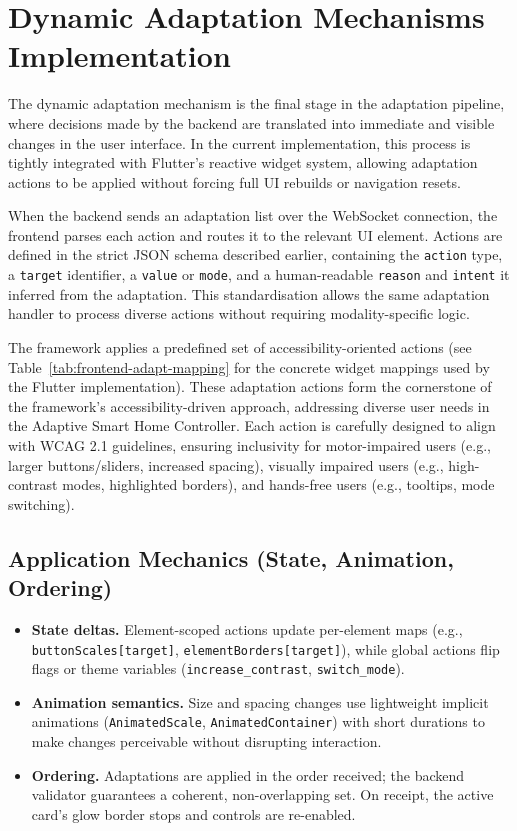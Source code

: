 \documentclass[openany]{book}
\begin{document}
\section{Dynamic Adaptation Mechanisms Implementation}
The dynamic adaptation mechanism is the final stage in the adaptation pipeline, where decisions made by the backend are translated into immediate and visible changes in the user interface. In the current implementation, this process is tightly integrated with Flutter’s reactive widget system, allowing adaptation actions to be applied without forcing full UI rebuilds or navigation resets.

When the backend sends an adaptation list over the WebSocket connection, the frontend parses each action and routes it to the relevant UI element. Actions are defined in the strict JSON schema described earlier, containing the \texttt{action} type, a \texttt{target} identifier, a \texttt{value} or \texttt{mode}, and a human-readable \texttt{reason} and \texttt{intent} it inferred from the adaptation. This standardisation allows the same adaptation handler to process diverse actions without requiring modality-specific logic.

The framework applies a predefined set of accessibility-oriented actions (see Table~\ref{tab:frontend-adapt-mapping} for the concrete widget mappings used by the Flutter implementation).
These adaptation actions form the cornerstone of the framework’s accessibility-driven approach, addressing diverse user needs in the Adaptive Smart Home Controller. Each action is carefully designed to align with WCAG 2.1 guidelines, ensuring inclusivity for motor-impaired users (e.g., larger buttons/sliders, increased spacing), visually impaired users (e.g., high-contrast modes, highlighted borders), and hands-free users (e.g., tooltips, mode switching).

\subsection{Application Mechanics (State, Animation, Ordering)}
\begin{itemize}
  \item \textbf{State deltas.} Element-scoped actions update per-element maps (e.g., \texttt{buttonScales[target]}, \texttt{elementBorders[target]}), while global actions flip flags or theme variables (\texttt{increase\_contrast}, \texttt{switch\_mode}).
  \item \textbf{Animation semantics.} Size and spacing changes use lightweight implicit animations (\texttt{AnimatedScale}, \texttt{AnimatedContainer}) with short durations to make changes perceivable without disrupting interaction.
  \item \textbf{Ordering.} Adaptations are applied in the order received; the backend validator guarantees a coherent, non-overlapping set. On receipt, the active card’s glow border stops and controls are re-enabled.
\end{itemize}
\end{document}
